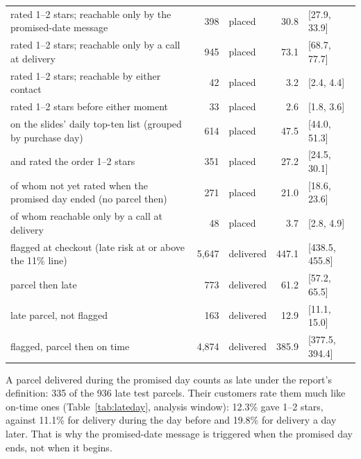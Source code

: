 \begin{table}[htbp]
\begin{tabular}{@{}p{8.2cm}rlrl@{}}
\addlinespace[2pt]
rated 1--2 stars; reachable only by the promised-date message & 398 & placed & 30.8 & [27.9, 33.9] \\
rated 1--2 stars; reachable only by a call at delivery & 945 & placed & 73.1 & [68.7, 77.7] \\
rated 1--2 stars; reachable by either contact & 42 & placed & 3.2 & [2.4, 4.4] \\
rated 1--2 stars before either moment & 33 & placed & 2.6 & [1.8, 3.6] \\
\addlinespace[2pt]
on the slides' daily top-ten list (grouped by purchase day) & 614 & placed & 47.5 & [44.0, 51.3] \\
\quad and rated the order 1--2 stars & 351 & placed & 27.2 & [24.5, 30.1] \\
\quad of whom not yet rated when the promised day ended (no parcel then) & 271 & placed & 21.0 & [18.6, 23.6] \\
\quad of whom reachable only by a call at delivery & 48 & placed & 3.7 & [2.8, 4.9] \\
\addlinespace[2pt]
flagged at checkout (late risk at or above the 11\% line) & 5{,}647 & delivered & 447.1 & [438.5, 455.8] \\
\quad parcel then late & 773 & delivered & 61.2 & [57.2, 65.5] \\
late parcel, not flagged & 163 & delivered & 12.9 & [11.1, 15.0] \\
flagged, parcel then on time & 4{,}874 & delivered & 385.9 & [377.5, 394.4] \\
\bottomrule
\end{tabular}
\end{table}

A parcel delivered during the promised day counts as late under the report's
definition: 335 of the 936 late test parcels. Their customers rate them much like
on-time ones (Table~\ref{tab:lateday}, analysis window): 12.3\% gave 1--2 stars,
against 11.1\% for delivery during the day before and 19.8\% for delivery a day
later. That is why the promised-date message is triggered when the promised day
ends, not when it begins.

